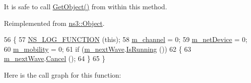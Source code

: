 It is safe to call \hyperlink{classns3_1_1Object_a13e18c00017096c8381eb651d5bd0783}{Get\+Object()} from within this method. 

Reimplemented from \hyperlink{classns3_1_1Object_a475d429a75d302d4775f4ae32479b287}{ns3\+::\+Object}.


\begin{DoxyCode}
56 \{
57   \hyperlink{log-macros-disabled_8h_a90b90d5bad1f39cb1b64923ea94c0761}{NS\_LOG\_FUNCTION} (\textcolor{keyword}{this});
58   \hyperlink{classns3_1_1WaveformGenerator_a509629fc4f14bfa2088aa2333201d4f3}{m\_channel} = 0;
59   \hyperlink{classns3_1_1WaveformGenerator_a7aa25d0649c5fae259f724a5fa48cdb9}{m\_netDevice} = 0;
60   \hyperlink{classns3_1_1WaveformGenerator_a2efb4c038ffdd5ce09363102c70ecc6f}{m\_mobility} = 0;
61   \textcolor{keywordflow}{if} (\hyperlink{classns3_1_1WaveformGenerator_a19a2480971ecc44ffc0dec3034bcfc29}{m\_nextWave}.\hyperlink{classns3_1_1EventId_aabf8476d1a080c199ea0c6aa9ccea372}{IsRunning} ())
62     \{
63       \hyperlink{classns3_1_1WaveformGenerator_a19a2480971ecc44ffc0dec3034bcfc29}{m\_nextWave}.\hyperlink{classns3_1_1EventId_a993ae94e48e014e1afd47edb16db7a11}{Cancel} ();
64     \}
65 \}
\end{DoxyCode}


Here is the call graph for this function\+:


